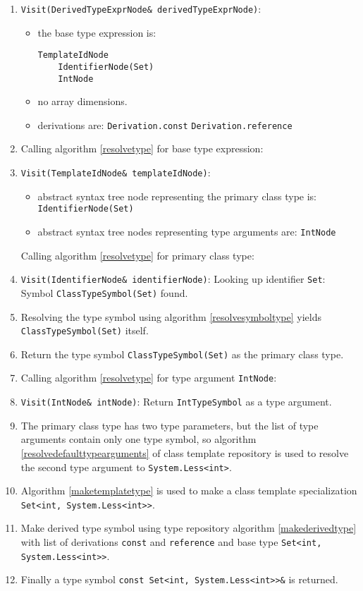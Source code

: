\documentclass[a4paper,oneside,11pt]{book}
\theoremstyle{definition}
\begin{document}
\begin{flushleft}
\begin{enumerate}
\item
\verb|Visit(DerivedTypeExprNode& derivedTypeExprNode)|:
\begin{itemize}
\item
the base type expression is:
\begin{verbatim}
TemplateIdNode
    IdentifierNode(Set)
    IntNode
\end{verbatim}
\item
no array dimensions.
\item
derivations are:
\verb|Derivation.const|
\verb|Derivation.reference|
\end{itemize}
\item
Calling algorithm \ref{resolvetype} for base type expression:
\item
\verb|Visit(TemplateIdNode& templateIdNode)|:
\begin{itemize}
\item
abstract syntax tree node representing the primary class type is:
\verb|IdentifierNode(Set)|
\item
abstract syntax tree nodes representing type arguments are:
\verb|IntNode|
\end{itemize}
Calling algorithm \ref{resolvetype} for primary class type:
\item
\verb|Visit(IdentifierNode& identifierNode)|:
Looking up identifier \verb|Set|:
Symbol \verb|ClassTypeSymbol(Set)| found.
\item
Resolving the type symbol using algorithm \ref{resolvesymboltype} yields \verb|ClassTypeSymbol(Set)| itself.
\item
Return the type symbol \verb|ClassTypeSymbol(Set)| as the primary class type.
\item
Calling algorithm \ref{resolvetype} for type argument \verb|IntNode|:
\item
\verb|Visit(IntNode& intNode)|:
Return \verb|IntTypeSymbol| as a type argument.
\item
The primary class type has two type parameters, but the list of type arguments contain only one type symbol,
so algorithm \ref{resolvedefaulttypearguments} of class template repository is used to resolve the second type argument to \verb|System.Less<int>|.
\item
Algorithm \ref{maketemplatetype} is used to make a class template specialization \verb|Set<int, System.Less<int>>|.
\item
Make derived type symbol using type repository algorithm \ref{makederivedtype} with list of derivations \verb|const| and \verb|reference| and
base type \verb|Set<int, System.Less<int>>|.
\item
Finally a type symbol \verb|const Set<int, System.Less<int>>&| is returned.
\end{enumerate}
\end{flushleft}
\end{document}

